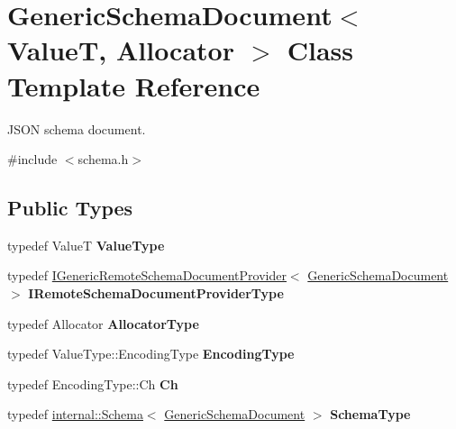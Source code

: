 \hypertarget{class_generic_schema_document}{}\section{Generic\+Schema\+Document$<$ ValueT, Allocator $>$ Class Template Reference}
\label{class_generic_schema_document}


J\+S\+ON schema document.  




{\ttfamily \#include $<$schema.\+h$>$}

\subsection*{Public Types}
\begin{DoxyCompactItemize}
\item 
typedef ValueT {\bfseries Value\+Type}\hypertarget{class_generic_schema_document_ae246f1b6573a5a8a2c0d73d4eb64d53a}{}\label{class_generic_schema_document_ae246f1b6573a5a8a2c0d73d4eb64d53a}

\item 
typedef \hyperlink{class_i_generic_remote_schema_document_provider}{I\+Generic\+Remote\+Schema\+Document\+Provider}$<$ \hyperlink{class_generic_schema_document}{Generic\+Schema\+Document} $>$ {\bfseries I\+Remote\+Schema\+Document\+Provider\+Type}\hypertarget{class_generic_schema_document_aa53ca323efce50f88aea6fa0d03e9785}{}\label{class_generic_schema_document_aa53ca323efce50f88aea6fa0d03e9785}

\item 
typedef Allocator {\bfseries Allocator\+Type}\hypertarget{class_generic_schema_document_ac0d88adf8c86917d8bc9563ffdab6a6d}{}\label{class_generic_schema_document_ac0d88adf8c86917d8bc9563ffdab6a6d}

\item 
typedef Value\+Type\+::\+Encoding\+Type {\bfseries Encoding\+Type}\hypertarget{class_generic_schema_document_ad0293c28c9ffe80ab1f8ec86efee35c8}{}\label{class_generic_schema_document_ad0293c28c9ffe80ab1f8ec86efee35c8}

\item 
typedef Encoding\+Type\+::\+Ch {\bfseries Ch}\hypertarget{class_generic_schema_document_ab1dec56a78b29649eb8e4b85b101ec7c}{}\label{class_generic_schema_document_ab1dec56a78b29649eb8e4b85b101ec7c}

\item 
typedef \hyperlink{classinternal_1_1_schema}{internal\+::\+Schema}$<$ \hyperlink{class_generic_schema_document}{Generic\+Schema\+Document} $>$ {\bfseries Schema\+Type}\hypertarget{class_generic_schema_document_acaf115202b159a2eb72c97c3dc6c3895}{}\label{class_generic_schema_document_acaf115202b159a2eb72c97c3dc6c3895}


\end{DoxyCompactItemize}
